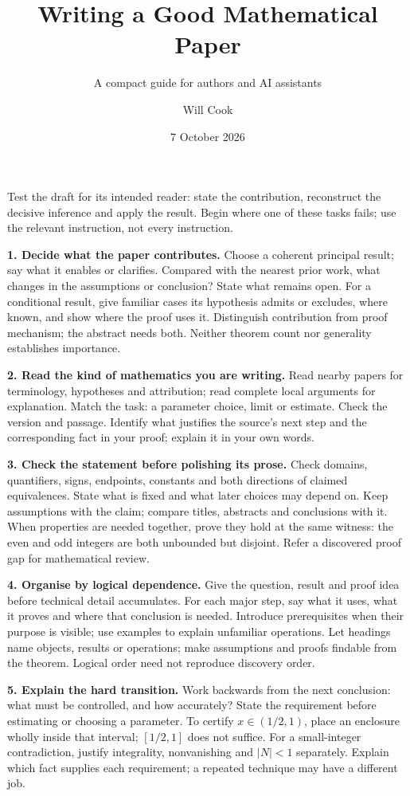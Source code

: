 \documentclass[10pt]{article}
\title{Writing a Good Mathematical Paper}
\subtitle{A compact guide for authors and AI assistants}
\author{Will Cook}
\date{7 October 2026}
\newcommand{\instruction}[2]{\par\medskip\noindent\textbf{#1.} #2\par}
\begin{document}
\maketitle
\paperprovenance
{}
Test the draft for its intended reader: state the contribution, reconstruct
the decisive inference and apply the result. Begin where one of these tasks
fails; use the relevant instruction, not every instruction.

\instruction{1. Decide what the paper contributes}{
Choose a coherent principal result; say what it enables or clarifies.
Compared with the nearest prior work, what changes in the assumptions or
conclusion? State what remains open. For a conditional result, give familiar
cases its hypothesis admits or excludes, where known, and show where the proof
uses it. Distinguish contribution from proof mechanism; the abstract needs
both. Neither theorem count nor generality establishes importance.}

\instruction{2. Read the kind of mathematics you are writing}{
Read nearby papers for terminology, hypotheses and attribution; read complete
local arguments for explanation. Match the task: a parameter choice, limit or
estimate. Check the version and passage. Identify what justifies the source's
next step and the corresponding fact in your proof; explain it in your own words.}

\instruction{3. Check the statement before polishing its prose}{
Check domains, quantifiers, signs, endpoints, constants and both directions
of claimed equivalences. State what is fixed and what later choices may depend
on. Keep assumptions with the claim; compare titles, abstracts and conclusions
with it. When properties are needed together, prove they hold at the same
witness: the even and odd integers are both unbounded but disjoint.
Refer a discovered proof gap for mathematical review.}

\instruction{4. Organise by logical dependence}{
Give the question, result and proof idea before technical detail accumulates.
For each major step, say what it uses, what it proves and where that conclusion
is needed. Introduce prerequisites when their purpose is visible; use examples
to explain unfamiliar operations. Let headings name objects, results or
operations; make assumptions and proofs findable from the theorem. Logical
order need not reproduce discovery order.}

\instruction{5. Explain the hard transition}{
Work backwards from the next conclusion: what must be controlled, and how
accurately? State the requirement before estimating or choosing a parameter.
To certify $x\in(1/2,1)$, place an enclosure wholly inside that interval;
$[1/2,1]$ does not suffice. For a small-integer contradiction, justify
integrality, nonvanishing and $|N|<1$ separately. Explain which fact supplies
each requirement; a repeated technique may have a different job.}
\end{document}
